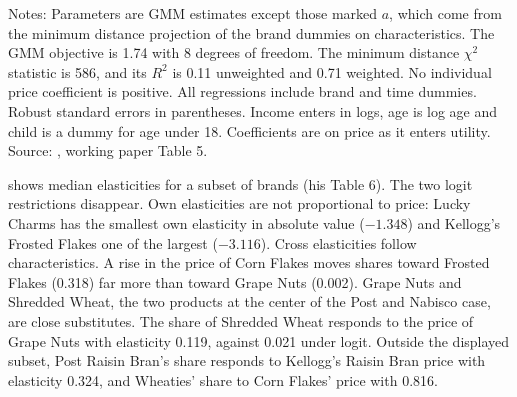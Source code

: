 \begin{table}[htbp]
\smallskip
\begin{minipage}{0.95\linewidth}
\footnotesize
Notes: Parameters are GMM estimates except those marked $a$, which come from the minimum distance projection of the
brand dummies on characteristics. The GMM objective is 1.74 with 8 degrees of freedom. The minimum distance $\chi^2$
statistic is 586, and its $R^2$ is 0.11 unweighted and 0.71 weighted. No individual price coefficient is positive. All regressions include brand and time dummies. Robust standard errors in parentheses.
Income enters in logs, age is log age and child is a dummy for age under 18. Coefficients are on price as it enters
utility. Source: \citet{Nevo2000b}, working paper Table 5.
\end{minipage}
\end{table}

 shows median elasticities for a subset of brands (his Table 6). The two logit restrictions
disappear. Own elasticities are not proportional to price: Lucky Charms has the smallest own elasticity in absolute
value ($-1.348$) and Kellogg's Frosted Flakes one of the largest ($-3.116$). Cross elasticities follow characteristics.
A rise in the price of Corn Flakes moves shares toward Frosted Flakes (0.318) far more than toward Grape Nuts (0.002).
Grape Nuts and Shredded Wheat, the two products at the center of the Post and Nabisco case, are close substitutes.
The share of Shredded Wheat responds to the price of Grape Nuts with elasticity 0.119, against 0.021 under logit. Outside the
displayed subset, Post Raisin Bran's share responds to Kellogg's Raisin Bran price with elasticity 0.324, and Wheaties'
share to Corn Flakes' price with 0.816.

